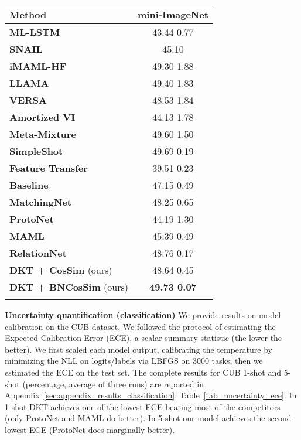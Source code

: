 \documentclass{article}
\begin{document}
\begin{table}[]
\begin{minipage}{0.37\linewidth}
\begin{adjustbox}{width=1.0\columnwidth,center}
\begin{tabular}{lc}
\hline
\small{\textbf{Method}} & \textbf{\small{mini-ImageNet}}\\
\hline
\small{\textbf{ML-LSTM}} \citep{ravi2017optimization} & 43.44  \small{0.77} \\
\small{\textbf{SNAIL}} \citep{mishra2018simple} & 45.10\\
\small{\textbf{iMAML-HF}} \citep{rajeswaran2019meta} & 49.30  \small{1.88}\\
\small{\textbf{LLAMA}} \citep{grant2018recasting} & 49.40  \small{1.83}\\
\small{\textbf{VERSA}} \citep{gordon2019meta} & 48.53  \small{1.84}\\
\small{\textbf{Amortized VI}} \citep{gordon2019meta} & 44.13  \small{1.78} \\
\small{\textbf{Meta-Mixture}} \citep{jerfel2019reconciling} & 49.60  \small{1.50} \\
\small{\textbf{SimpleShot}} \citep{wang2019simpleshot} & 49.69  \small{0.19} \\
\small{\textbf{Feature Transfer}} & 39.51  \small{0.23} \\
\small{\textbf{Baseline}} \citep{chen2019closerfewshot} & 47.15  \small{0.49} \\
\small{\textbf{MatchingNet}} \citep{vinyals2016matching} & 48.25  \small{0.65} \\
\small{\textbf{ProtoNet}} \citep{snell2017prototypical} & 44.19  \small{1.30} \\
\small{\textbf{MAML}}  \citep{finn2017model} & 45.39  \small{0.49} \\
\small{\textbf{RelationNet}} \citep{sung2018learning} & 48.76  \small{0.17} \\
\hline
\small{\textbf{DKT + CosSim}} (ours) & 48.64  \small{0.45} \\
\small{\textbf{DKT + BNCosSim}} (ours) & \textbf{49.73  \small{0.07}} \\
\hline
\label{tab:results_1shot_mini}
\end{tabular}
\end{adjustbox}
    \end{minipage}
\end{table}

\textbf{Uncertainty quantification (classification)} We provide results on model calibration on the CUB dataset. We followed the protocol of \cite{guo2017calibration} estimating the Expected Calibration Error (ECE), a scalar summary statistic (the lower the better). We first scaled each model output, calibrating the temperature by minimizing the NLL on logits/labels via LBFGS on 3000 tasks; then we estimated the ECE on the test set. The complete results for CUB 1-shot and 5-shot (percentage, average of three runs) are reported in Appendix~\ref{sec:appendix_results_classification}, Table~\ref{tab_uncertainty_ece}. In 1-shot DKT achieves one of the lowest ECE  beating most of the competitors (only ProtoNet and MAML do better). In 5-shot our model achieves the second lowest ECE  (ProtoNet does marginally better).
\end{document}
